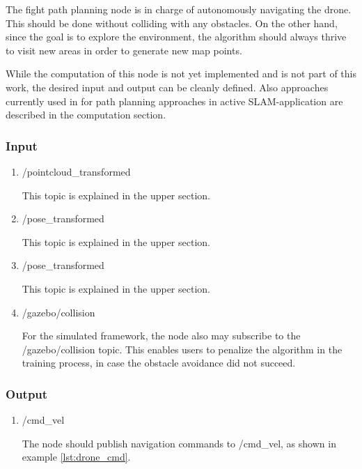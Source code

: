 	The fight path planning node is in charge of autonomously navigating the drone. This should be done without colliding with any obstacles. 
	On the other hand, since the goal is to explore the environment, the algorithm should always thrive to visit new areas in order to generate 
	new map points. 
	
	While the computation of this node is not yet implemented and is not part of this work, the desired input and output can be cleanly defined. 
	Also approaches currently used in for path planning approaches in active SLAM-application are described in the computation section. 
	
	\subsubsection{Input}
	
	\begin{enumerate}
	\item{/pointcloud\_transformed}
	
	This topic is explained in the upper section. 
	
	\item{/pose\_transformed}
	
	This topic is explained in the upper section.
	
	\item{/pose\_transformed}
	
	This topic is explained in the upper section.
	
	\item{/gazebo/collision}
	
	For the simulated framework, the node also may subscribe to the /gazebo/collision topic. This enables users to penalize the algorithm in the training 
	process, in case the obstacle avoidance did not succeed.
	
	
	\end{enumerate}
	
	\subsubsection{Output}
	
	\begin{enumerate}
	\item{/cmd\_vel}
	
	The node should publish navigation commands to /cmd\_vel, as shown in example \ref{lst:drone_cmd}.
	
	\end{enumerate}
	
